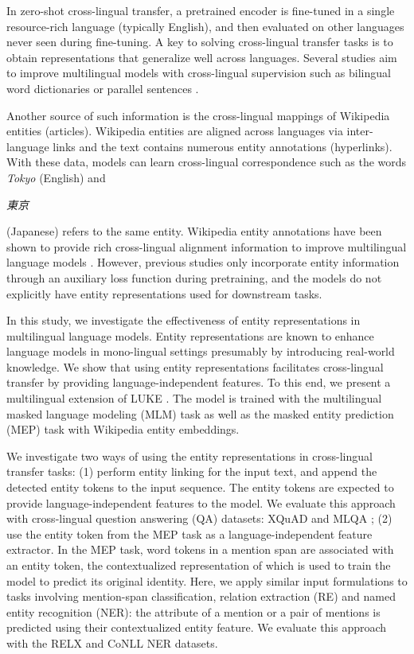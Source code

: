 \documentclass[11pt]{article}
\newcommand{\ja}[1]{\begin{CJK}{UTF8}{min}#1\end{CJK}}
\begin{document}
In zero-shot cross-lingual transfer, a pretrained encoder is fine-tuned in a single resource-rich language (typically English), and then evaluated on other languages never seen during fine-tuning.
A key to solving cross-lingual transfer tasks is to obtain representations that generalize well across languages.
Several studies aim to improve multilingual models with cross-lingual supervision such as bilingual word dictionaries \citep{conneau-etal-2020-emerging} or parallel sentences \citep{NEURIPS2019_c04c19c2}.

Another source of such information is the cross-lingual mappings of Wikipedia entities (articles).
Wikipedia entities are aligned across languages via inter-language links and the text contains numerous entity annotations (hyperlinks).
With these data, models can learn cross-lingual correspondence such as the words {\it Tokyo} (English) and \ja{{\it 東京}} (Japanese) refers to the same entity.
Wikipedia entity annotations have been shown to provide rich cross-lingual alignment information to improve multilingual language models \citep{Calixto2021naacl,XLM-K-2021-arxiv}.
However, previous studies only incorporate entity information through an auxiliary loss function during pretraining, and the models do not explicitly have entity representations used for downstream tasks.

In this study, we investigate the effectiveness of entity representations in multilingual language models.
Entity representations are known to enhance language models in mono-lingual settings \citep{Zhang2019,peters-knowbert,wang2019kepler,Xiong2020Pretrained,yamada-etal-2020-luke} presumably by introducing real-world knowledge.
We show that using entity representations facilitates cross-lingual transfer by providing language-independent features.
To this end, we present a multilingual extension of LUKE \citep{yamada-etal-2020-luke}.
The model is trained with the multilingual masked language modeling (MLM) task as well as the masked entity prediction (MEP) task with Wikipedia entity embeddings.

We investigate two ways of using the entity representations in cross-lingual transfer tasks:
(1) perform entity linking for the input text, and append the detected entity tokens to the input sequence. The entity tokens are expected to provide language-independent features to the model.
We evaluate this approach with cross-lingual question answering (QA) datasets: XQuAD \citep{artetxe-etal-2020-cross} and MLQA \citep{lewis-etal-2020-mlqa};
(2) use the entity \mask{} token from the MEP task as a language-independent feature extractor.
In the MEP task, word tokens in a mention span are associated with an entity \mask{} token, the contextualized representation of which is used to train the model to predict its original identity.
Here, we apply similar input formulations to tasks involving mention-span classification, relation extraction (RE) and named entity recognition (NER): the attribute of a mention or a pair of mentions is predicted using their contextualized entity \mask{} feature.
We evaluate this approach with the RELX \citep{koksal-ozgur-2020-relx} and CoNLL NER \citep{tjong-kim-sang-2002-introduction,TjongKimSang-DeMeulder:2003:CONLL} datasets.
\end{document}
